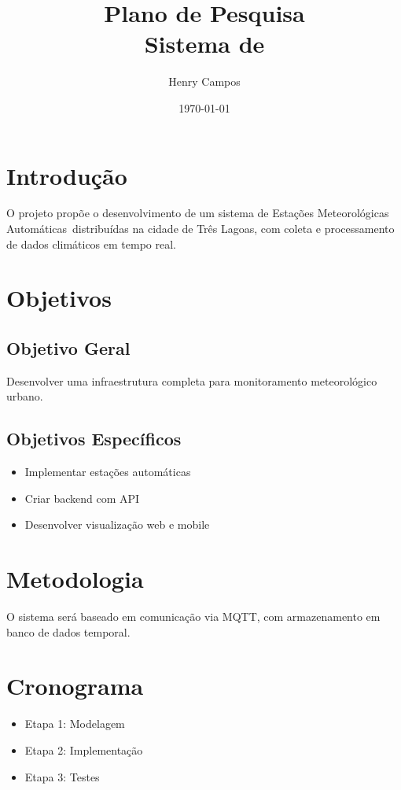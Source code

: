 \documentclass[12pt]{article}
\title{Plano de Pesquisa \\ Sistema de \ema}
\author{Henry Campos}
\date{\today}
\newcommand{\ema}{Estações Meteorológicas Automáticas}
\newcommand{\mqtt}{MQTT}
\newcommand{\api}{API}
\begin{document}
\maketitle
\tableofcontents
\newpage

\section{Introdução}

O projeto propõe o desenvolvimento de um sistema de \ema\ distribuídas na cidade de Três Lagoas, com coleta e processamento de dados climáticos em tempo real.

\section{Objetivos}

\subsection{Objetivo Geral}
Desenvolver uma infraestrutura completa para monitoramento meteorológico urbano.

\subsection{Objetivos Específicos}
\begin{itemize}
    \item Implementar estações automáticas
    \item Criar backend com \api
    \item Desenvolver visualização web e mobile
\end{itemize}

\section{Metodologia}

O sistema será baseado em comunicação via \mqtt, com armazenamento em banco de dados temporal.

\section{Cronograma}

\begin{itemize}
    \item Etapa 1: Modelagem
    \item Etapa 2: Implementação
    \item Etapa 3: Testes
\end{itemize}



\end{document}
